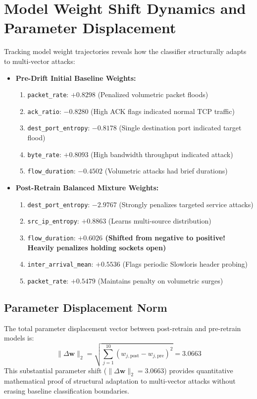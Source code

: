 \documentclass[12pt,a4paper,oneside]{report}
\begin{document}
\section{Model Weight Shift Dynamics and Parameter Displacement}
Tracking model weight trajectories reveals how the classifier structurally adapts to multi-vector attacks:
\begin{itemize}
    \item \textbf{Pre-Drift Initial Baseline Weights:}
    \begin{enumerate}
        \item \texttt{packet\_rate}: $+0.8298$ (Penalized volumetric packet floods)
        \item \texttt{ack\_ratio}: $-0.8280$ (High ACK flags indicated normal TCP traffic)
        \item \texttt{dest\_port\_entropy}: $-0.8178$ (Single destination port indicated target flood)
        \item \texttt{byte\_rate}: $+0.8093$ (High bandwidth throughput indicated attack)
        \item \texttt{flow\_duration}: $-0.4502$ (Volumetric attacks had brief durations)
    \end{enumerate}
    \item \textbf{Post-Retrain Balanced Mixture Weights:}
    \begin{enumerate}
        \item \texttt{dest\_port\_entropy}: $-2.9767$ (Strongly penalizes targeted service attacks)
        \item \texttt{src\_ip\_entropy}: $+0.8863$ (Learns multi-source distribution)
        \item \texttt{flow\_duration}: \textbf{$+0.6026$ (Shifted from negative to positive! Heavily penalizes holding sockets open)}
        \item \texttt{inter\_arrival\_mean}: $+0.5536$ (Flags periodic Slowloris header probing)
        \item \texttt{packet\_rate}: $+0.5479$ (Maintains penalty on volumetric surges)
    \end{enumerate}
\end{itemize}

\subsection{Parameter Displacement Norm}
The total parameter displacement vector between post-retrain and pre-retrain models is:
\begin{equation}
\|\Delta \mathbf{w}\|_2 = \sqrt{\sum_{j=1}^{10} (w_{j,\text{post}} - w_{j,\text{pre}})^2} = 3.0663
\end{equation}
This substantial parameter shift ($\|\Delta \mathbf{w}\|_2 = 3.0663$) provides quantitative mathematical proof of structural adaptation to multi-vector attacks without erasing baseline classification boundaries.
\end{document}
